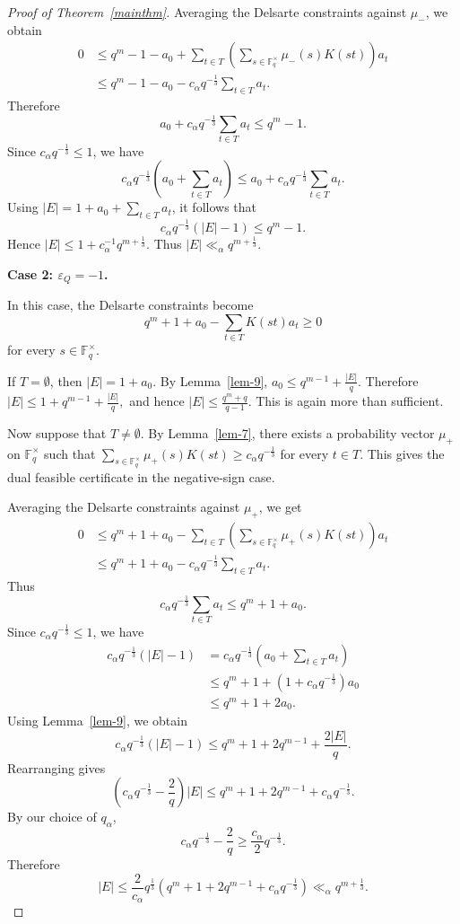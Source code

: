 \documentclass[11pt]{article}
\newcommand{\F}{\mathbb{F}}
\newcommand{\1}{\mathbf{1}}
\begin{document}
\begin{proof}[Proof of Theorem~\ref{mainthm}]
	Averaging the Delsarte constraints against \(\mu_-\), we obtain
	\begin{align*}
		0
		&\le
		q^m-1-a_0
		+
		\sum_{t\in T}
		\left(
		\sum_{s\in\F_q^\times}\mu_-(s)K(st)
		\right)
		a_t \\
		&\le
		q^m-1-a_0
		-
		c_\alpha q^{-\frac{1}{3}}
		\sum_{t\in T}a_t.
	\end{align*}
	Therefore
	\[
	a_0+c_\alpha q^{-\frac{1}{3}}\sum_{t\in T}a_t
	\le
	q^m-1.
	\]
	Since \(c_\alpha q^{-\frac{1}{3}}\le1\), we have
	\[
	c_\alpha q^{-\frac{1}{3}}
	\left(
	a_0+\sum_{t\in T}a_t
	\right)
	\le
	a_0+c_\alpha q^{-\frac{1}{3}}\sum_{t\in T}a_t.
	\]
	Using \(|E|=1+a_0+\sum_{t\in T}a_t\), it follows that
	\[
	c_\alpha q^{-\frac{1}{3}}(|E|-1)
	\le
	q^m-1.
	\]
	Hence $|E|\le 1+c_\alpha^{-1}q^{m+\frac13}.$
	Thus $|E|\ll_\alpha q^{m+\frac13}.$
	
	\medskip
	
	\noindent
	\textbf{Case 2: \(\varepsilon_Q=-1\).}
	
	In this case, the Delsarte constraints become
	\[
	q^m+1+a_0-\sum_{t\in T}K(st)a_t\ge0
	\]
	for every \(s\in\F_q^\times\).
	
	If \(T=\emptyset\), then \(|E|=1+a_0\). By Lemma~\ref{lem-9}, $a_0\le q^{m-1}+\frac{|E|}{q}.$
	Therefore $|E|
	\le
	1+q^{m-1}+\frac{|E|}{q},$
	and hence $|E|
	\le
	\frac{q^m+q}{q-1}.$
	This is again more than sufficient.
	
	Now suppose that \(T\ne\emptyset\). By Lemma~\ref{lem-7}, there exists a
	probability vector \(\mu_+\) on \(\F_q^\times\) such that $\sum_{s\in\F_q^\times}\mu_+(s)K(st)
	\ge
	c_\alpha q^{-\frac{1}{3}}$
	for every \(t\in T\). This gives the dual feasible certificate in the
	negative-sign case.
	
	Averaging the Delsarte constraints against \(\mu_+\), we get
	\begin{align*}
		0
		&\le
		q^m+1+a_0
		-
		\sum_{t\in T}
		\left(
		\sum_{s\in\F_q^\times}\mu_+(s)K(st)
		\right)
		a_t \\
		&\le
		q^m+1+a_0
		-
		c_\alpha q^{-\frac{1}{3}}
		\sum_{t\in T}a_t.
	\end{align*}
	Thus
	\[
	c_\alpha q^{-\frac{1}{3}}\sum_{t\in T}a_t
	\le
	q^m+1+a_0.
	\]
	Since \(c_\alpha q^{-\frac{1}{3}}\le1\), we have
	\begin{align*}
		c_\alpha q^{-\frac{1}{3}}(|E|-1)
		&=
		c_\alpha q^{-\frac{1}{3}}
		\left(
		a_0+\sum_{t\in T}a_t
		\right) \\
		&\le
		q^m+1+(1+c_\alpha q^{-\frac{1}{3}})a_0 \\
		&\le
		q^m+1+2a_0.
	\end{align*}
	Using Lemma~\ref{lem-9}, we obtain
	\[
	c_\alpha q^{-\frac{1}{3}}(|E|-1)
	\le
	q^m+1+2q^{m-1}+\frac{2|E|}{q}.
	\]
	Rearranging gives
	\[
	\left(
	c_\alpha q^{-\frac{1}{3}}-\frac{2}{q}
	\right)|E|
	\le
	q^m+1+2q^{m-1}+c_\alpha q^{-\frac{1}{3}}.
	\]
	By our choice of \(q_\alpha\),
	\[
	c_\alpha q^{-\frac{1}{3}}-\frac{2}{q}
	\ge
	\frac{c_\alpha}{2}q^{-\frac{1}{3}}.
	\]
	Therefore
	\[
	|E|
	\le
	\frac{2}{c_\alpha}
	q^{\frac{1}{3}}
	\left(
	q^m+1+2q^{m-1}+c_\alpha q^{-\frac{1}{3}}
	\right)
	\ll_\alpha
	q^{m+\frac13}.
	\]
	

\end{proof}
\end{document}
